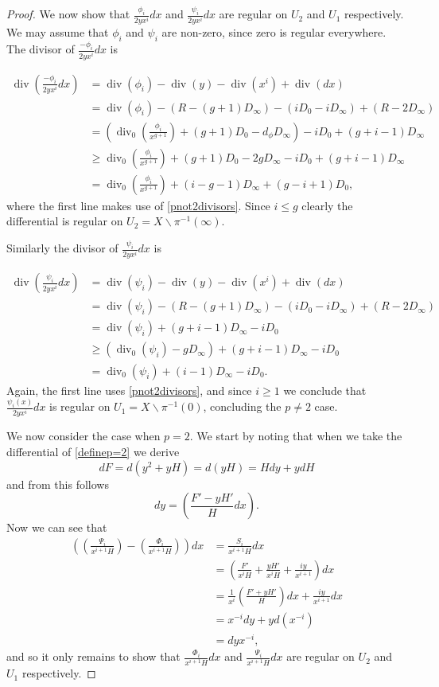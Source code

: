 \documentclass[draft, 11pt]{article} %
\theoremstyle{plain}
\theoremstyle{remark}
\DeclareMathOperator{\di}{div}
\begin{document}
\begin{proof}
We now show that $\frac{\phi_i}{2yx^i}dx$ and $\frac{\psi_i}{2yx^i}dx$ are regular on $U_2$ and $U_1$ respectively.
We may assume that $\phi_i$ and $\psi_i$ are non-zero, since zero is regular everywhere.
The divisor of $\frac{-\phi_i}{2yx^i}dx$ is

\begin{align*}
\di\left( \frac{-\phi_i}{2yx^i}dx \right) & =  \di(\phi_i) -\di(y) - \di(x^i) + \di (dx) \\
& =  \di(\phi_i) - ( R - (g+1)D_\infty) - (iD_0 - iD_\infty) + (R - 2D_\infty) \\
& =  \left( \di_0\left( \frac{\phi_i}{x^{g+1}}\right) + (g+1)D_0 - d_\phi D_\infty\right) - iD_0 + (g+i-1)D_\infty \\
& \geq  \di_0\left( \frac{\phi_i}{x^{g+1}}\right) + (g+1)D_0 - 2gD_\infty - iD_0 + (g+i-1)D_\infty \\
& =  \di_0\left( \frac{\phi_i}{x^{g+1}} \right) + (i-g-1)D_\infty + (g-i+1)D_0,
\end{align*}
where the first line makes use of \eqref{pnot2divisors}.
Since $i \leq g$ clearly the differential is regular on $U_2 = X\backslash \pi^{-1}(\infty)$.

Similarly the divisor of $\frac{\psi_i}{2yx^i}dx$ is

\begin{align*}
\di \left( \frac{\psi_i}{2yx^i}dx\right) & =  \di(\psi_i) - \di(y) - \di(x^i) + \di (dx) \\
& =  \di (\psi_i ) -(R - (g+1)D_\infty) - (iD_0 - iD_\infty) + (R -2D_\infty) \\
& =  \di(\psi_i) + (g+i-1)D_\infty -iD_0 \\
& \geq \left( \di_0(\psi_i) - gD_\infty \right) + (g+i-1)D_\infty -iD_0 \\
& =  \di_0(\psi_i) + (i-1)D_\infty - iD_0.
\end{align*}
Again, the first line uses \eqref{pnot2divisors}, and since $i\geq 1$ we conclude that $\frac{\psi_i(x)}{2yx^i}dx$ is regular on $U_1 = X \backslash \pi^{-1}(0)$, concluding the $p\neq 2$ case.


We now consider the case when $p=2$.
We start by noting that when we take the differential of \eqref{definep=2} we derive
\[
dF = d\left(y^2 + yH \right) = d(yH) = Hdy + ydH
\]
and from this follows 
\[
dy = \left(\frac{F'-yH'}{H}dx\right).
\]
Now we can see that
\begin{align*}
\left( \left( \frac{ \Psi_i}{x^{i+1}H} \right) - \left( \frac{\Phi_i}{x^{i+1}H} \right) \right) dx & =  \frac{S_i}{x^{i+1}H}dx \\
& =  \left( \frac{F'}{x^iH} + \frac{yH'}{x^iH} + \frac{iy}{x^{i+1}} \right) dx \\
& =  \frac{1}{x^i}\left( \frac{F' + yH'}{H} \right) dx + \frac{iy}{x^{i+1}}dx \\
& =  x^{-i}dy + yd \left( x^{-i}\right) \\
& =  dyx^{-i},
\end{align*}
and so it only remains to show that $\frac{\Phi_i}{x^{i+1}H}dx$ and $\frac{\Psi_i}{x^{i+1}H}dx$ are regular on $U_2$ and $U_1$ respectively.



\end{proof}
\end{document}
